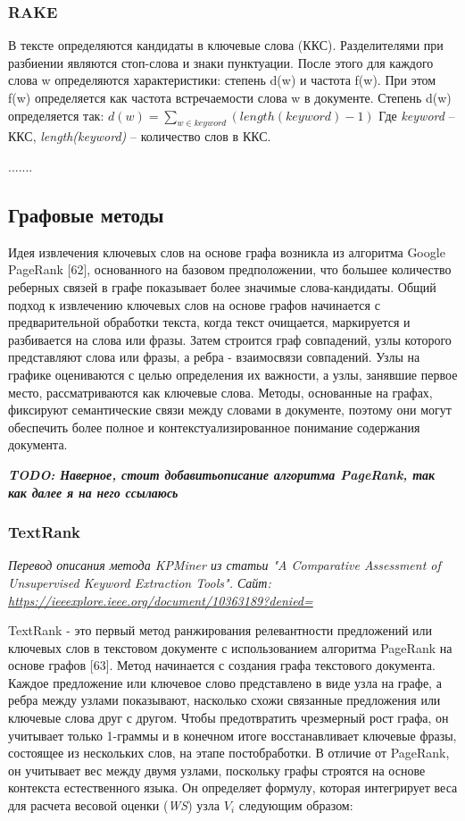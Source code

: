 \documentclass[bachelor, och, diploma ]{SCWorks}
\begin{document}
\subsubsection{RAKE}

В тексте определяются кандидаты в ключевые слова (ККС). Разделителями при разбиении являются стоп-слова и знаки пунктуации. После этого для каждого слова w определяются характеристики: степень d(w) и частота f(w). 
При этом f(w) определяется как частота встречаемости слова w в документе. 
Степень d(w) определяется так:
$d(w)= \sum_{w\in keyword}^{} (length(keyword) - 1)$
Где \textit{keyword} – ККС, \textit{length(keyword)} – количество слов в ККС.

.......

\subsection{Графовые методы}
Идея извлечения ключевых слов на основе графа возникла из алгоритма Google PageRank [62], основанного на базовом предположении, что большее количество реберных связей в графе показывает более значимые слова-кандидаты. Общий подход к извлечению ключевых слов на основе графов начинается с предварительной обработки текста, когда текст очищается, маркируется и разбивается на слова или фразы. Затем строится граф совпадений, узлы которого представляют слова или фразы, а ребра - взаимосвязи совпадений. Узлы на графике оцениваются с целью определения их важности, а узлы, занявшие первое место, рассматриваются как ключевые слова. Методы, основанные на графах, фиксируют семантические связи между словами в документе, поэтому они могут обеспечить более полное и контекстуализированное понимание содержания документа.

\textbf{\textit{TODO: Наверное, стоит добавитьописание алгоритма PageRank, так как далее я на него ссылаюсь}}


\subsubsection{TextRank}
\textit{Перевод описания метода KPMiner из статьи "A Comparative Assessment of Unsupervised Keyword Extraction Tools". Сайт: \url{https://ieeexplore.ieee.org/document/10363189?denied=}}

TextRank - это первый метод ранжирования релевантности предложений или ключевых слов в текстовом документе с использованием алгоритма PageRank на основе графов [63]. Метод начинается с создания графа текстового документа. Каждое предложение или ключевое слово представлено в виде узла на графе, а ребра между узлами показывают, насколько схожи связанные предложения или ключевые слова друг с другом. Чтобы предотвратить чрезмерный рост графа, он учитывает только 1-граммы и в конечном итоге восстанавливает ключевые фразы, состоящее из нескольких слов, на этапе постобработки. В отличие от PageRank, он учитывает вес между двумя узлами, поскольку графы строятся на основе контекста естественного языка. Он определяет формулу, которая интегрирует веса для расчета весовой оценки (\textit{WS}) узла $V_i$ следующим образом:
\end{document}
